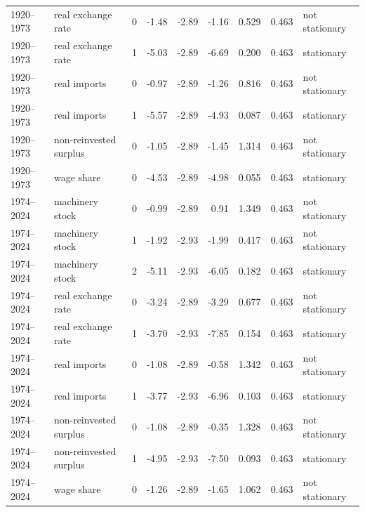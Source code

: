 \documentclass[11pt]{article}
\begin{document}
\begin{table}[H]
\begin{tabular}{p{1.9cm}p{2.6cm}p{1.1cm}rrrrrp{2.0cm}}
1920--1973 & real exchange rate & 0 & -1.48 & -2.89 & -1.16 & 0.529 & 0.463 & not stationary \\
1920--1973 & real exchange rate & 1 & -5.03 & -2.89 & -6.69 & 0.200 & 0.463 & stationary \\
1920--1973 & real imports & 0 & -0.97 & -2.89 & -1.26 & 0.816 & 0.463 & not stationary \\
1920--1973 & real imports & 1 & -5.57 & -2.89 & -4.93 & 0.087 & 0.463 & stationary \\
1920--1973 & non-reinvested surplus & 0 & -1.05 & -2.89 & -1.45 & 1.314 & 0.463 & not stationary \\
1920--1973 & wage share & 0 & -4.53 & -2.89 & -4.98 & 0.055 & 0.463 & stationary \\
1974--2024 & machinery stock & 0 & -0.99 & -2.89 & 0.91 & 1.349 & 0.463 & not stationary \\
1974--2024 & machinery stock & 1 & -1.92 & -2.93 & -1.99 & 0.417 & 0.463 & not stationary \\
1974--2024 & machinery stock & 2 & -5.11 & -2.93 & -6.05 & 0.182 & 0.463 & stationary \\
1974--2024 & real exchange rate & 0 & -3.24 & -2.89 & -3.29 & 0.677 & 0.463 & not stationary \\
1974--2024 & real exchange rate & 1 & -3.70 & -2.93 & -7.85 & 0.154 & 0.463 & stationary \\
1974--2024 & real imports & 0 & -1.08 & -2.89 & -0.58 & 1.342 & 0.463 & not stationary \\
1974--2024 & real imports & 1 & -3.77 & -2.93 & -6.96 & 0.103 & 0.463 & stationary \\
1974--2024 & non-reinvested surplus & 0 & -1.08 & -2.89 & -0.35 & 1.328 & 0.463 & not stationary \\
1974--2024 & non-reinvested surplus & 1 & -4.95 & -2.93 & -7.50 & 0.093 & 0.463 & stationary \\
1974--2024 & wage share & 0 & -1.26 & -2.89 & -1.65 & 1.062 & 0.463 & not stationary \\
\bottomrule
\end{tabular}
\end{table}
\end{document}
